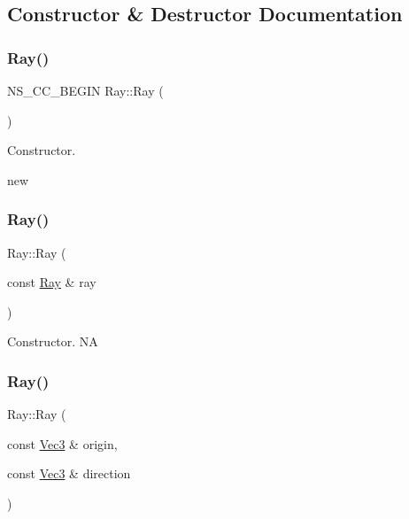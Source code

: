 \subsection{Constructor \& Destructor Documentation}
\mbox{\label{classRay_a242189a4eefe94210201132de3fec277}} 
\subsubsection{\texorpdfstring{Ray()}{Ray()}\hspace{0.1cm}{\footnotesize\ttfamily [1/6]}}
{\footnotesize\ttfamily N\+S\+\_\+\+C\+C\+\_\+\+B\+E\+G\+IN Ray\+::\+Ray (\begin{DoxyParamCaption}{ }\end{DoxyParamCaption})}

Constructor.

new \mbox{\label{classRay_a155a0b6573cf6a9a2256eb5062523daf}} 
\subsubsection{\texorpdfstring{Ray()}{Ray()}\hspace{0.1cm}{\footnotesize\ttfamily [2/6]}}
{\footnotesize\ttfamily Ray\+::\+Ray (\begin{DoxyParamCaption}\item[{const \hyperlink{classRay}{Ray} \&}]{ray }\end{DoxyParamCaption})}

Constructor.  NA \mbox{\label{classRay_a9753a2cb8797a9c4d96883d79085d4ee}} 
\subsubsection{\texorpdfstring{Ray()}{Ray()}\hspace{0.1cm}{\footnotesize\ttfamily [3/6]}}
{\footnotesize\ttfamily Ray\+::\+Ray (\begin{DoxyParamCaption}\item[{const \hyperlink{classVec3}{Vec3} \&}]{origin,  }\item[{const \hyperlink{classVec3}{Vec3} \&}]{direction }\end{DoxyParamCaption})}

